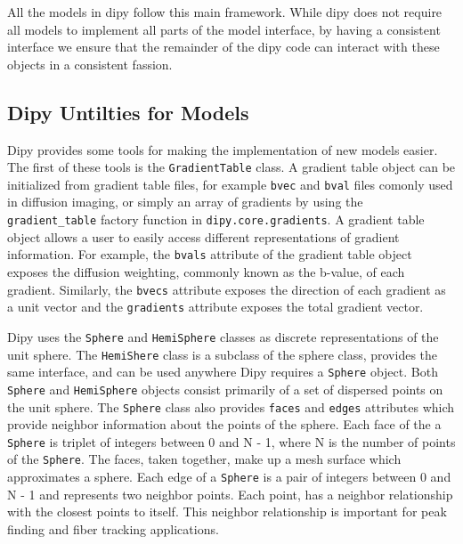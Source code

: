 All the models in dipy follow this main framework. While dipy does not require all models to implement all parts of the model interface, by having a consistent interface we ensure that the remainder of the dipy code can interact with these objects in a consistent fassion.

\subsection{Dipy Untilties for Models}
Dipy provides some tools for making the implementation of new models easier. The first of these tools is the \verb|GradientTable| class. A gradient table object can be initialized from gradient table files, for example \verb|bvec| and \verb|bval| files comonly used in diffusion imaging, or simply an array of gradients by using the \verb|gradient_table| factory function in \verb|dipy.core.gradients|. A gradient table object allows a user to easily access different representations of gradient information. For example, the \verb|bvals| attribute of the gradient table object exposes the diffusion weighting, commonly known as the b-value, of each gradient. Similarly, the \verb|bvecs| attribute exposes the direction of each gradient as a unit vector and the \verb|gradients| attribute exposes the total gradient vector.

Dipy uses the \verb|Sphere| and \verb|HemiSphere| classes as discrete representations of the unit sphere. The \verb|HemiShere| class is a subclass of the sphere class, provides the same interface, and can be used anywhere Dipy requires a \verb|Sphere| object.  Both \verb|Sphere| and \verb|HemiSphere| objects consist primarily of a set of dispersed points on the unit sphere. The \verb|Sphere| class also provides \verb|faces| and \verb|edges| attributes which provide neighbor information about the points of the sphere. Each face of the a \verb|Sphere| is triplet of integers between 0 and N - 1, where N is the number of points of the \verb|Sphere|. The faces, taken together, make up a mesh surface which approximates a sphere. Each edge of a \verb|Sphere| is a pair of integers between 0 and N - 1 and represents two neighbor points. Each point, has a neighbor relationship with the closest points to itself. This neighbor relationship is important for peak finding and fiber tracking applications.

